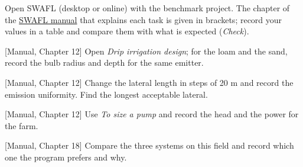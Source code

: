 {\small Open SWAFL (desktop or online) with the benchmark project. The chapter of the \href{https://github.com/halilunaziru73-creator/Coupled-Water-Fluxes-Pore-Scale-Dynamics-Precision-Irrigation-Mulching-Feedback-Loops/raw/main/Software/v1.1.0/SWAFL_Desktop/docs/manual_v1.1.0/SWAFL_Manual_v1.1.0.pdf}{SWAFL manual} that explains each task is given in brackets; record your values in a table and compare them with what is expected (\emph{Check}).}\par\vspace{3pt}
\begin{exlist}
\item {\color{khblue}[Manual, Chapter 12]} Open \emph{Drip irrigation design}; for the loam and the sand, record the bulb radius and depth for the same emitter.\par{}
\item {\color{khblue}[Manual, Chapter 12]} Change the lateral length in steps of 20 m and record the emission uniformity. Find the longest acceptable lateral.\par{}
\item {\color{khblue}[Manual, Chapter 12]} Use \emph{To size a pump} and record the head and the power for the farm.\par{}
\item {\color{khblue}[Manual, Chapter 18]} Compare the three systems on this field and record which one the program prefers and why.\par{}
\end{exlist}
